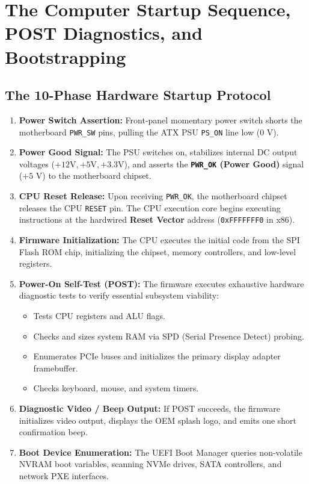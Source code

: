 \section{The Computer Startup Sequence, POST Diagnostics, and Bootstrapping}
\label{sec:boot_sequence}

\subsection{The 10-Phase Hardware Startup Protocol}
\begin{enumerate}[label=\bfseries\arabic*.]
    \item \textbf{Power Switch Assertion:} Front-panel momentary power switch shorts the motherboard \texttt{PWR\_SW} pins, pulling the ATX PSU \texttt{PS\_ON} line low ($0\text{ V}$).
    \item \textbf{Power Good Signal:} The PSU switches on, stabilizes internal DC output voltages ($+12\text{V}, +5\text{V}, +3.3\text{V}$), and asserts the \textbf{\texttt{PWR\_OK} (Power Good)} signal ($+5\text{ V}$) to the motherboard chipset.
    \item \textbf{CPU Reset Release:} Upon receiving \texttt{PWR\_OK}, the motherboard chipset releases the CPU \texttt{RESET} pin. The CPU execution core begins executing instructions at the hardwired \textbf{Reset Vector} address (\texttt{0xFFFFFFF0} in x86).
    \item \textbf{Firmware Initialization:} The CPU executes the initial code from the SPI Flash ROM chip, initializing the chipset, memory controllers, and low-level registers.
    \item \textbf{Power-On Self-Test (POST):} The firmware executes exhaustive hardware diagnostic tests to verify essential subsystem viability:
    \begin{itemize}
        \item Tests CPU registers and ALU flags.
        \item Checks and sizes system RAM via SPD (Serial Presence Detect) probing.
        \item Enumerates PCIe buses and initializes the primary display adapter framebuffer.
        \item Checks keyboard, mouse, and system timers.
    \end{itemize}
    \item \textbf{Diagnostic Video / Beep Output:} If POST succeeds, the firmware initializes video output, displays the OEM splash logo, and emits one short confirmation beep.
    \item \textbf{Boot Device Enumeration:} The UEFI Boot Manager queries non-volatile NVRAM boot variables, scanning NVMe drives, SATA controllers, and network PXE interfaces.

\end{enumerate}
